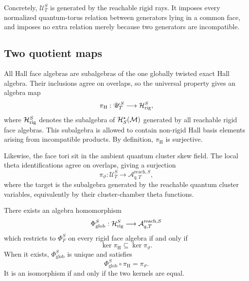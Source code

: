 Concretely, $\mathscr U_T^S$ is generated by the reachable rigid rays.  It
imposes every normalized quantum-torus relation between generators lying in a
common face, and imposes no extra relation merely because two generators are
incompatible.

\subsection{Two quotient maps}

All Hall face algebras are subalgebras of the one globally twisted exact Hall
algebra.  Their inclusions agree on overlaps, so the universal property gives
an algebra map
\begin{equation}
 \pi_{\mathrm H}:\mathscr U_T^S
 \longrightarrow\mathcal H_{\mathrm{rig}}^S,
 \label{eq:pi-H}
\end{equation}
where $\mathcal H_{\mathrm{rig}}^S$ denotes the subalgebra of
$\mathcal H_S^\star(\mathcal M)$ generated by all reachable rigid face algebras.  This
subalgebra is allowed to contain non-rigid Hall basis elements arising from
incompatible products.  By definition, $\pi_{\mathrm H}$ is surjective.

Likewise, the face tori sit in the ambient quantum cluster skew field.  The
local theta identifications agree on overlaps, giving a surjection
\begin{equation}
 \pi_\vartheta:\mathscr U_T^S
 \longrightarrow\mathcal A_{q,T}^{\mathrm{reach},S},
 \label{eq:pi-theta}
\end{equation}
where the target is the subalgebra generated by the reachable quantum cluster
variables, equivalently by their cluster-chamber theta functions.

\begin{theorem}
\label{thm:kernel-criterion}
There exists an algebra homomorphism
\begin{equation}
 \Phi_{\mathrm{glob}}^S:
 \mathcal H_{\mathrm{rig}}^S
 \longrightarrow
 \mathcal A_{q,T}^{\mathrm{reach},S}
 \label{eq:global-Hall-theta-map}
\end{equation}
which restricts to $\Phi_F^S$ on every rigid face algebra if and only if
\begin{equation}
 \boxed{\ker\pi_{\mathrm H}\subseteq\ker\pi_\vartheta.}
 \label{eq:kernel-inclusion}
\end{equation}
When it exists, $\Phi_{\mathrm{glob}}^S$ is unique and satisfies
\[
 \Phi_{\mathrm{glob}}^S\circ\pi_{\mathrm H}=\pi_\vartheta.
\]
It is an isomorphism if and only if the two kernels are equal.
\end{theorem}

